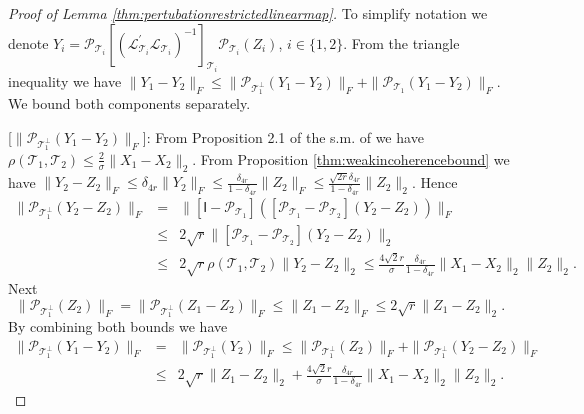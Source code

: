 \documentclass[11pt,letterpaper]{article}
\newcommand{\ct}{\mathcal{T}}
\newcommand{\cp}{\mathcal{P}}
\newcommand{\sfi}{\mathsf{I}}
\begin{document}
\begin{proof}[Proof of Lemma \ref{thm:pertubationrestrictedlinearmap}]
	
	To simplify notation we denote $Y_i = \cp_{\ct_i} [(\mathcal{L}^{\prime}_{\ct_i}\mathcal{L}_{\ct_i})^{-1}]_{\ct_i} \cp_{\ct_i} (Z_i)$, $i \in \{1,2\}$.  From the triangle inequality we have $\| Y_1 - Y_2 \|_F \leq \| \cp_{\ct_1^{\perp}} (Y_1 - Y_2) \|_F + \| \cp_{\ct_1} (Y_1 - Y_2) \|_F $. We bound both components separately.
	
	[$ \| \cp_{\ct_1^{\perp}} (Y_1 - Y_2) \|_F $]: From Proposition 2.1 of the s.m. of \cite{CPW:12} we have $\rho(\ct_1,\ct_2) \leq \frac{2}{\sigma}\|X_1-X_2\|_2$.  From Proposition \ref{thm:weakincoherencebound} we have $\| Y_2 - Z_2 \|_F \leq \delta_{4r} \| Y_2 \|_F \leq \frac{\delta_{4r}}{1-\delta_{4r}} \| Z_2 \|_F \leq \frac{\sqrt{2r}\delta_{4r}}{1-\delta_{4r}} \| Z_2 \|_2$. Hence
	\begin{eqnarray*}
		\| \cp_{\ct_1^{\perp}}(Y_2 - Z_2)\|_F & = & \| [\sfi-\cp_{\ct_1}]([\cp_{\ct_1} - \cp_{\ct_2}](Y_2 - Z_2))\|_F \\
		& \leq & 2 \sqrt{r} \| [\cp_{\ct_1} - \cp_{\ct_2}](Y_2 - Z_2) \|_2 \\
		& \leq & 2 \sqrt{r} \rho(\ct_1,\ct_2)\|Y_2 - Z_2\|_2 \leq \frac{4\sqrt{2}r}{\sigma} \frac{\delta_{4r}}{1-\delta_{4r}} \|X_1-X_2\|_2 \| Z_2 \|_2 .
	\end{eqnarray*}
	Next
	\begin{equation*}
		\| \cp_{\ct_1^{\perp}}( Z_2)\|_F  = \| \cp_{\ct_1^{\perp}}( Z_1 - Z_2)\|_F \leq \| Z_1 - Z_2 \|_F \leq 2 \sqrt{r} \| Z_1 - Z_2 \|_2.
	\end{equation*}	
	By combining both bounds we have
	\begin{eqnarray*}
		\| \cp_{\ct_1^{\perp}}(Y_1 - Y_2)\|_F & = & \| \cp_{\ct_1^{\perp}}( Y_2)\|_F \leq \| \cp_{\ct_1^{\perp}}( Z_2)\|_F + \| \cp_{\ct_1^{\perp}}( Y_2 - Z_2 )\|_F \\
		& \leq & 2\sqrt{r} \| Z_1 - Z_2 \|_2 + \frac{4\sqrt{2}r}{\sigma} \frac{\delta_{4r}}{1-\delta_{4r}} \|X_1-X_2\|_2 \| Z_2 \|_2.
	\end{eqnarray*}
	

\end{proof}
\end{document}
